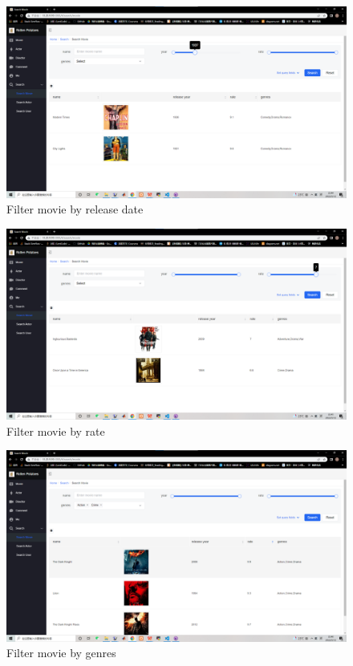\begin{CJK*}{UTF8}{gbsn}
    \begin{figure}[htbp]
    \centering
    \includegraphics[width=1\textwidth]{res_search3.png}
    \caption{Filter movie by release date}
    \end{figure}
    
    \begin{figure}[htbp]
    \centering
    \includegraphics[width=1\textwidth]{res_search4.png}
    \caption{Filter movie by rate}
    \end{figure}
    
    \begin{figure}[htbp]
    \centering
    \includegraphics[width=1\textwidth]{res_search5.png}
    \caption{Filter movie by genres}
    \end{figure}
    

\end{CJK*}
